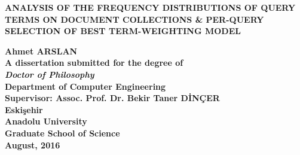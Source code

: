 %
%
%

\makeatother
{}
\thispagestyle{empty}
\setcounter{tocdepth}{3}
\begin{spacing}{1.0}
\vspace*{1cm}
\begin{center}{\textbf{ANALYSIS OF THE FREQUENCY DISTRIBUTIONS OF QUERY TERMS ON DOCUMENT COLLECTIONS \& PER-QUERY SELECTION OF BEST TERM-WEIGHTING MODEL}}\end{center}
\vspace*{4cm}
\begin{center}{\textbf{Ahmet ARSLAN}}
\vspace*{4cm}
\textbf{
\\{A dissertation submitted for the degree of}
\\{\emph{Doctor of Philosophy}}\vspace{0.6cm}
\\{Department of Computer Engineering}
\\{Supervisor: Assoc. Prof. Dr. Bekir Taner D\.{I}N\c{C}ER}
}
\vspace*{5cm}
\textbf{
\\{Eski\c{s}ehir}
\\{Anadolu University}
\\{Graduate School of Science}
\\{August, 2016} 
}
\end{center}
\end{spacing} 
